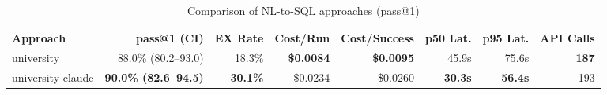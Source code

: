 \begin{table}[htbp]
\centering
\caption{Comparison of NL-to-SQL approaches (pass@1)}
\label{tab:comparison}
\begin{tabular}{lrrrrrrr}
\toprule
Approach & pass@1 (CI) & EX Rate & Cost/Run & Cost/Success & p50 Lat. & p95 Lat. & API Calls \\
\midrule
university & 88.0\% (80.2--93.0) & 18.3\% & \textbf{\$0.0084} & \textbf{\$0.0095} & 45.9s & 75.6s & \textbf{187} \\
university-claude & \textbf{90.0\% (82.6--94.5)} & \textbf{30.1\%} & \$0.0234 & \$0.0260 & \textbf{30.3s} & \textbf{56.4s} & 193 \\
\bottomrule
\end{tabular}
\end{table}
